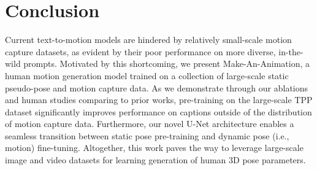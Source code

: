 \documentclass[10pt,twocolumn,letterpaper]{article}
\begin{document}
\section{Conclusion}
Current text-to-motion models are hindered by relatively small-scale motion capture datasets, as evident by their poor performance on more diverse, in-the-wild prompts. Motivated by this shortcoming, we present Make-An-Animation, a human motion generation model trained on a collection of large-scale static pseudo-pose and motion capture data. As we demonstrate through our ablations and human studies comparing to prior works, pre-training on the large-scale TPP dataset significantly improves performance on captions outside of the distribution of motion capture data. Furthermore, our novel U-Net architecture enables a seamless transition between static pose pre-training and dynamic pose (i.e., motion) fine-tuning. Altogether, this work paves the way to leverage large-scale image and video datasets for learning generation of human 3D pose parameters.



\newpage

{\small


}
\end{document}
